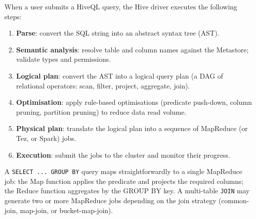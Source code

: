 When a user submits a HiveQL query, the Hive driver executes the
following steps:
\begin{enumerate}
  \item \textbf{Parse}: convert the SQL string into an abstract syntax
        tree (AST).
  \item \textbf{Semantic analysis}: resolve table and column names
        against the Metastore; validate types and permissions.
  \item \textbf{Logical plan}: convert the AST into a logical query
        plan (a DAG of relational operators: scan, filter, project,
        aggregate, join).
  \item \textbf{Optimisation}: apply rule-based optimisations
        (predicate push-down, column pruning, partition pruning) to
        reduce data read volume.
  \item \textbf{Physical plan}: translate the logical plan into a
        sequence of MapReduce (or Tez, or Spark) jobs.
  \item \textbf{Execution}: submit the jobs to the cluster and monitor
        their progress.
\end{enumerate}

A \texttt{SELECT ... GROUP BY} query maps straightforwardly to a
single MapReduce job: the Map function applies the predicate and
projects the required columns; the Reduce function aggregates by
the GROUP BY key. A multi-table \texttt{JOIN} may generate two or
more MapReduce jobs depending on the join strategy (common-join,
map-join, or bucket-map-join).

